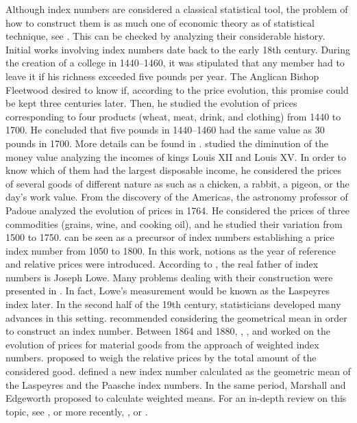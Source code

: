 Although index numbers are considered a classical statistical tool, the problem of how to construct them is as much one of economic theory as of statistical technique, see \cite{frisch1936annual}. This can be checked by analyzing their considerable history.  Initial works involving index numbers date back to the early 18th century.  During the creation of a college in 1440–1460, it was stipulated that any member had to leave it if his richness exceeded five pounds per year. The Anglican Bishop Fleetwood desired to know if, according to the price evolution, this promise could be kept three centuries later. Then, he studied the evolution of prices corresponding to four products (wheat, meat, drink, and clothing) from 1440 to 1700.  He concluded that five pounds in 1440–1460 had the same value as 30 pounds in 1700. More details can be found in \cite{fleetwood1707chronicon}. \cite{de1754reflexions} studied the diminution of the money value analyzing the incomes of kings Louis XII and Louis XV. In order to know which of them had the largest disposable income, he considered the prices of several goods of different nature as such as a chicken, a rabbit, a pigeon, or the day’s work value.  From the discovery of the Americas, the astronomy professor of Padoue analyzed the evolution of prices in 1764. He considered the prices of three commodities (grains, wine, and cooking oil), and he studied their variation from 1500 to 1750.  \cite{evelyn1798account} can be seen as a precursor of index numbers establishing a price index number from 1050 to 1800. In this work, notions as the year of reference and relative prices were introduced.  According to \cite{kendall}, the real father of index numbers is Joseph Lowe. Many problems dealing with their construction were presented in \cite{lowe1822present}. In fact,  Lowe's measurement would be known as the Laspeyres index later. In the second half of the 19th century, statisticians developed many advances in this setting.  \cite{jevons1863serious} recommended considering the geometrical mean in order to construct an index number. Between 1864 and 1880, \cite{laspeyres1864hamburger, laspeyres1871ix}, \cite{drobisch1871ueber}, and \cite{paasche1874ueber} worked on the evolution of prices for material goods from the approach of  weighted index numbers.  \cite{palgrave1886currency} proposed to weigh the relative prices by the total amount of the considered good. \cite{fisher1922making} defined a new index number calculated as the geometric mean of the Laspeyres and the Paasche index numbers. In the same period, Marshall and Edgeworth proposed to calculate weighted means.  For an in-depth review on this topic, see \cite{kendall1969studies}, \cite{allen1982index} or more recently, \cite{manual2004consumer}, or \cite{dodge2008concise}.  

